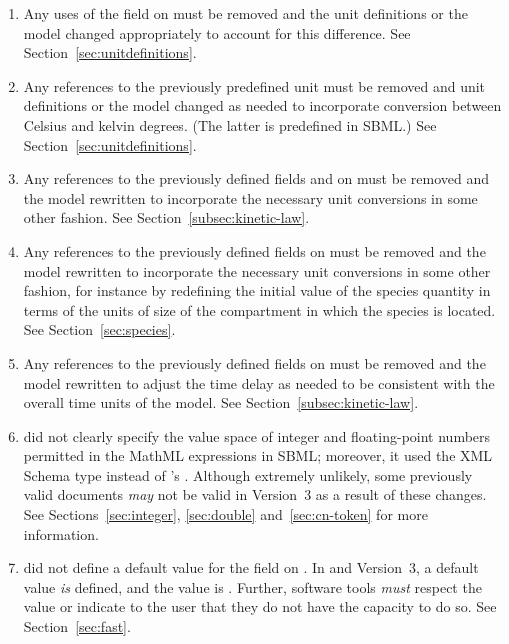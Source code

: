 \begin{blockChanged}
\begin{enumerate}
\item Any uses of the field  on \UnitDefinition must
  be removed and the unit definitions or the model changed
  appropriately to account for this difference.  See
  Section~\ref{sec:unitdefinitions}.
  
\item Any references to the previously predefined unit
   must be removed and unit definitions or the model
  changed as needed to incorporate conversion between Celsius
  and kelvin degrees.  (The latter is predefined in SBML.)  See
  Section~\ref{sec:unitdefinitions}.
  
\item Any references to the previously defined fields
   and  on \KineticLaw
  must be removed and the model rewritten to incorporate the
  necessary unit conversions in some other fashion.  See
  Section~\ref{subsec:kinetic-law}.
  
\item Any references to the previously defined fields
   on \Species must be removed and the
  model rewritten to incorporate the necessary unit conversions in
  some other fashion, for instance by redefining the initial value
  of the species quantity in terms of the units of size of the
  compartment in which the species is located.  See
  Section~\ref{sec:species}.

\item Any references to the previously defined fields
   on \Event must be removed and the model
  rewritten to adjust the time delay as needed to be consistent
  with the overall time units of the model.  See
  Section~\ref{subsec:kinetic-law}.
  
\item \sbmltwoone did not clearly specify the value space of
  integer and floating-point numbers permitted in the MathML
  expressions in SBML; moreover, it used the XML Schema type
   instead of \sbmltwotwo's .  Although
  extremely unlikely, some previously valid \sbmltwoone documents
  \emph{may} not be valid in Version~3 as a result of these
  changes.  See Sections~\ref{sec:integer}, \ref{sec:double}
  and~\ref{sec:cn-token} for more information.

\item \sbmltwoone did not define a default value for the field
   on \Reaction.  In \sbmltwotwo and Version~3, a
  default value \emph{is} defined, and the value is .
  Further, software tools \emph{must} respect the value or
  indicate to the user that they do not have the capacity to do
  so.  See Section~\ref{sec:fast}.
  

\end{enumerate}
\end{blockChanged}
